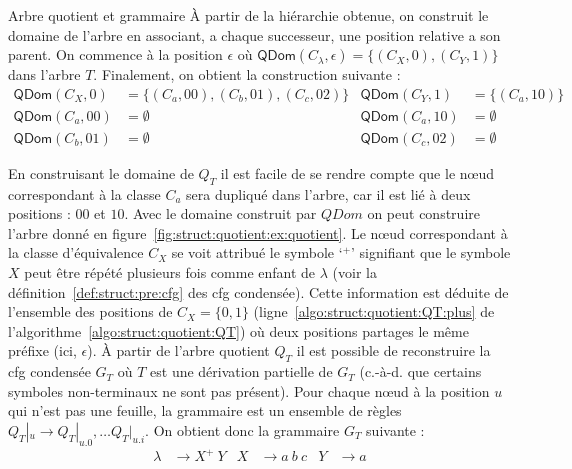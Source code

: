 \begin{example}{Arbre quotient et grammaire}
    À partir de la hiérarchie obtenue, on construit le domaine de l'arbre en associant, a chaque successeur, une position relative a son parent. On commence à la position $\epsilon$ où $\textsf{QDom}(C_\lambda, \epsilon) = \{(C_X, 0), (C_Y, 1)\}$ dans l'arbre $T$.
    Finalement, on obtient la construction suivante :
    \begin{align*}
        \textsf{QDom}(C_X, 0)  & = \{(C_a, 00), (C_b, 01), (C_c, 02)\} & \textsf{QDom}(C_Y, 1)  & = \{(C_a, 10)\} \\
        \textsf{QDom}(C_a, 00) & = \emptyset                           & \textsf{QDom}(C_a, 10) & = \emptyset     \\
        \textsf{QDom}(C_b, 01) & = \emptyset                           & \textsf{QDom}(C_c, 02) & = \emptyset
    \end{align*}

    En construisant le domaine de $Q_T$ il est facile de se rendre compte que le nœud correspondant à la classe $C_a$ sera dupliqué dans l'arbre, car il est lié à deux positions : $00$ et $10$.
    Avec le domaine construit par $QDom$ on peut construire l'arbre donné en figure~\ref{fig:struct:quotient:ex:quotient}.
    Le nœud correspondant à la classe d'équivalence $C_X$ se voit attribué le symbole `${}^+$' signifiant que le symbole $X$ peut être répété plusieurs fois comme enfant de $\lambda$ (voir la définition~\ref{def:struct:pre:cfg} des \gls{cfg} condensée).
    Cette information est déduite de l'ensemble des positions de $C_X = \{0, 1\}$ (ligne~\ref{algo:struct:quotient:QT:plus} de l'algorithme~\ref{algo:struct:quotient:QT}) où deux positions partages le même préfixe (ici, $\epsilon$).
    À partir de l'arbre quotient $Q_T$ il est possible de reconstruire la \gls{cfg} condensée $G_T$ où $T$ est une dérivation partielle de $G_T$ (c.-à-d. que certains symboles non-terminaux ne sont pas présent).
    Pour chaque nœud à la position $u$ qui n'est pas une feuille, la grammaire est un ensemble de règles $Q_T|_u \to Q_T|_{u.0}, \dots Q_T|_{u.i}$.
    On obtient donc la grammaire $G_T$ suivante :
    \begin{align*}
        \lambda & \to X^+ ~ Y & X & \to a ~ b ~ c & Y & \to a
    \end{align*}

\end{example}

